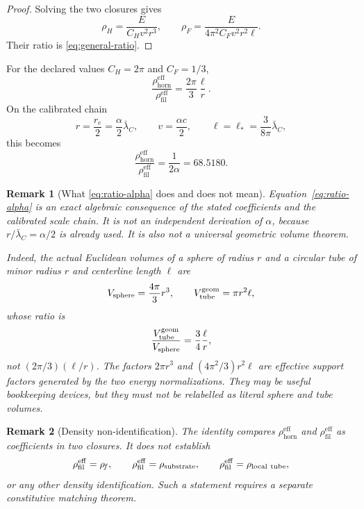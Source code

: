 \documentclass[aps,pre,preprint,notitlepage,nofootinbib,superscriptaddress]{revtex4-2}
\newcommand{\lC}{\bar\lambda_C}
\newcommand{\re}{r_e}
\newcommand{\rhohorn}{\rho_{\mathrm{horn}}^{\mathrm{eff}}}
\newcommand{\rhofil}{\rho_{\mathrm{fil}}^{\mathrm{eff}}}
\newtheorem{remark}{Remark}
\begin{document}
\begin{proof}
Solving the two closures gives
\[
\rho_H=\frac{E}{C_Hv^2r^3},
\qquad
\rho_F
=\frac{E}{4\pi^2C_Fv^2r^2\ell}.
\]
Their ratio is \cref{eq:general-ratio}.
\end{proof}

For the declared values \(C_H=2\pi\) and \(C_F=1/3\),
\begin{equation}
  \frac{\rhohorn}{\rhofil}
  =
  \frac{2\pi}{3}\frac{\ell}{r}.
  \label{eq:specific-ratio}
\end{equation}
On the calibrated chain
\begin{equation}
  r=\frac{\re}{2}
  =\frac{\alpha}{2}\lC,
  \qquad
  v=\frac{\alpha c}{2},
  \qquad
  \ell=\ell_*=\frac{3}{8\pi}\lC,
  \label{eq:calibrated-chain}
\end{equation}
this becomes
\begin{equation}
  \boxed{
  \frac{\rhohorn}{\rhofil}
  =
  \frac{1}{2\alpha}
  =68.5180
  }.
  \label{eq:ratio-alpha}
\end{equation}

\begin{remark}[What \cref{eq:ratio-alpha} does and does not mean]
Equation~\eqref{eq:ratio-alpha} is an exact algebraic consequence of the stated coefficients and the calibrated scale chain.  It is not an independent derivation of \(\alpha\), because \(r/\lC=\alpha/2\) is already used.  It is also not a universal geometric volume theorem.

Indeed, the actual Euclidean volumes of a sphere of radius \(r\) and a circular tube of minor radius \(r\) and centerline length \(\ell\) are
\[
V_{\rm sphere}=\frac{4\pi}{3}r^3,
\qquad
V_{\rm tube}^{\rm geom}=\pi r^2\ell,
\]
whose ratio is
\[
\frac{V_{\rm tube}^{\rm geom}}{V_{\rm sphere}}
=\frac34\frac{\ell}{r},
\]
not \((2\pi/3)(\ell/r)\).  The factors \(2\pi r^3\) and
\((4\pi^2/3)r^2\ell\) are effective support factors generated by the two energy normalizations.  They may be useful bookkeeping devices, but they must not be relabelled as literal sphere and tube volumes.
\end{remark}

\begin{remark}[Density non-identification]
The identity compares \(\rhohorn\) and \(\rhofil\) as coefficients in two closures.  It does not establish
\[
\rhofil=\rho_{\!f},
\qquad
\rhofil=\rho_{\rm substrate},
\qquad
\rhofil=\rho_{\rm local\ tube},
\]
or any other density identification.  Such a statement requires a separate constitutive matching theorem.
\end{remark}
\end{document}
